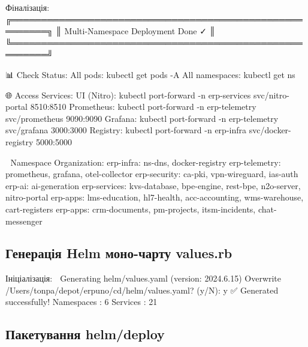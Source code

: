 \documentclass[12pt,a4paper]{article}
\let\originalfootnotesize\footnotesize
\let\oldverbatim\verbatim
\let\oldendverbatim\endverbatim
\renewenvironment{verbatim}{\originalfootnotesize\oldverbatim}{\oldendverbatim}
\begin{document}
\newpage
Фіналізація:
\begin{verbatim}
╔════════════════════════════════════════════════════════╗
║           Multi-Namespace Deployment Done ✓            ║
╚════════════════════════════════════════════════════════╝

📊 Check Status:\n
   All pods: kubectl get pods -A
   All namespaces: kubectl get ns

🌐 Access Services:\n
   UI (Nitro): kubectl port-forward -n erp-services svc/nitro-portal 8510:8510
   Prometheus: kubectl port-forward -n erp-telemetry svc/prometheus 9090:9090
   Grafana: kubectl port-forward -n erp-telemetry svc/grafana 3000:3000
   Registry: kubectl port-forward -n erp-infra svc/docker-registry 5000:5000

📁 Namespace Organization:\n
       erp-infra: ns-dns, docker-registry
   erp-telemetry: prometheus, grafana, otel-collector
    erp-security: ca-pki, vpn-wireguard, ias-auth
          erp-ai: ai-generation
    erp-services: kvs-database, bpe-engine, rest-bpe, n2o-server, nitro-portal
        erp-apps: lms-education, hl7-health, acc-accounting, wms-warehouse, cart-registers
        erp-apps: crm-documents, pm-projects, itsm-incidents, chat-messenger

\end{verbatim}

\subsection{Генерація Helm моно-чарту values.rb}

Ініціалізація:
\begin{verbatim}
🔨 Generating helm/values.yaml  (version: 2024.6.15)
Overwrite /Users/tonpa/depot/erpuno/cd/helm/values.yaml? (y/N): y
✅ Generated successfully!
   Namespaces : 6
   Services   : 21
\end{verbatim}

\newpage
\subsection{Пакетування helm/deploy}
\end{document}
